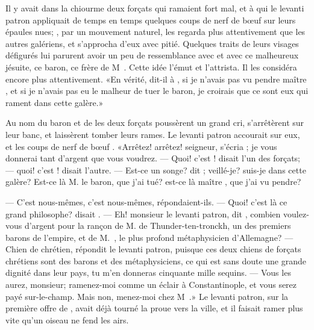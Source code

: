 Il y avait dans la chiourme deux forçats qui ramaient fort mal, et à
qui le levanti patron appliquait de temps en temps quelques coups de
nerf de bœuf sur leurs épaules nues; , par un mouvement
naturel, les regarda plus attentivement que les autres galériens, et
s’approcha d’eux avec pitié. Quelques traits de leurs visages défigurés
lui parurent avoir un peu de ressemblance avec  et avec ce
malheureux jésuite, ce baron, ce frère de M~. Cette
idée l’émut et l’attrista. Il les considéra encore plus attentivement.
«En vérité, dit-il à , si je n’avais pas vu pendre maître
, et si je n’avais pas eu le malheur de tuer le baron, je
croirais que ce sont eux qui rament dans cette galère.»


Au nom du baron et de  les deux forçats poussèrent un grand
cri, s’arrêtèrent sur leur banc, et laissèrent tomber leurs rames. Le
levanti patron accourait sur eux, et les coups de nerf de bœuf
. «Arrêtez! arrêtez! seigneur, s’écria ; je vous
donnerai tant d’argent que vous voudrez. — Quoi! c’est ! disait
l’un des forçats; — quoi! c’est ! disait l’autre. — Est-ce un songe?
dit ; veillé-je? suis-je dans cette galère? Est-ce là M.
le baron, que j’ai tué? est-ce là maître , que j’ai vu pendre?


— C’est nous-mêmes, c’est nous-mêmes, répondaient-ils. — Quoi! c’est là ce
grand philosophe? disait . — Eh! monsieur le levanti patron, dit
, combien voulez-vous d’argent pour la rançon de M. de
Thunder-ten-tronckh, un des premiers barons de l’empire, et de M.~, le plus profond métaphysicien d’Allemagne? — Chien de chrétien,
répondit le levanti patron, puisque ces deux chiens de forçats
chrétiens sont des barons et des métaphysiciens, ce qui est sans doute
une grande dignité dans leur pays, tu m’en donneras cinquante mille
sequins. — Vous les aurez, monsieur; ramenez-moi comme un éclair à
Constantinople, et vous serez payé sur-le-champ. Mais non, menez-moi
chez M~.» Le levanti patron, sur la première offre
de , avait déjà tourné la proue vers la ville, et il faisait
ramer plus vite qu’un oiseau ne fend les airs.

